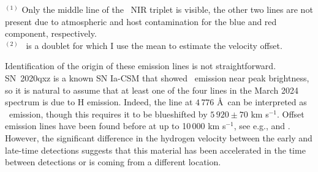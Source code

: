 \documentclass[a4paper,oneside,12pt, class=Latex/Classes/PhDthesisPSnPDF, crop=false]{standalone}
\begin{document}
\begin{table}[]
    \centering
    \caption{Line fits for the emission lines identified in the March 2024 spectrum at the position of SN 2020qxz. The first three columns give the central wavelength and width (in \AA\ and km s$^{-1}$) of the fitted lines. The last three columns give the most likely matched elements and emission lines, assuming some amount of blueshift velocity offset (given in the last column). The redshift uncertainty contribution to the velocity offset ($120$~km~s$^{-1}$) has not been included. All fits are done in the SN rest frame.}
    \begin{flushleft}
        $^{(1)}$ Only the middle line of the \CaII\ NIR triplet is visible, the other two lines are not present due to atmospheric and host contamination for the blue and red component, respectively.\\
        $^{(2)}$ \KI\ is a doublet for which I use the mean to estimate the velocity offset.
    \end{flushleft}
    \label{fitres_2020qxz}
\end{table}

Identification of the origin of these emission lines is not straightforward. SN~2020qxz is a known SN Ia-CSM that showed \Halpha\ emission near peak brightness, so it is natural to assume that at least one of the four lines in the March 2024 spectrum is due to H emission. Indeed, the line at $4\,776$ \AA~can be interpreted as \Hbeta\ emission, though this requires it to be blueshifted by $5\,920\pm70$ km s$^{-1}$. Offset emission lines have been found before at up to 10\,000 km s$^{-1}$, see e.g., \cite{2019bkc_Chen} and \cite{2019bkc_Prentice}. However, the significant difference in the hydrogen velocity between the early and late-time detections suggests that this material has been accelerated in the time between detections or is coming from a different location.
\end{document}

